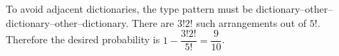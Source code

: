 To avoid adjacent dictionaries, the type pattern must be dictionary--other--dictionary--other--dictionary. There are $3!2!$ such arrangements out of $5!$. Therefore the desired probability is $1-\dfrac{3!2!}{5!}=\boxed{\dfrac{9}{10}}$.
